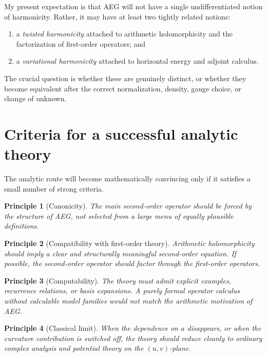 \documentclass[11pt]{article}
\newtheorem{principle}{Principle}[section]
\newcommand{\AEG}{AEG}
\begin{document}
My present expectation is that \AEG{} will not have a single undifferentiated notion of harmonicity. Rather, it may have at least two tightly related notions:
\begin{enumerate}[label=(\roman*)]
\item a \emph{twisted harmonicity} attached to arithmetic holomorphicity and the factorization of first-order operators; and
\item a \emph{variational harmonicity} attached to horizontal energy and adjoint calculus.
\end{enumerate}
The crucial question is whether these are genuinely distinct, or whether they become equivalent after the correct normalization, density, gauge choice, or change of unknown.

\section{Criteria for a successful analytic theory}

The analytic route will become mathematically convincing only if it satisfies a small number of strong criteria.

\begin{principle}[Canonicity]
The main second-order operator should be forced by the structure of \AEG{}, not selected from a large menu of equally plausible definitions.
\end{principle}

\begin{principle}[Compatibility with first-order theory]
Arithmetic holomorphicity should imply a clear and structurally meaningful second-order equation. If possible, the second-order operator should factor through the first-order operators.
\end{principle}

\begin{principle}[Computability]
The theory must admit explicit examples, recurrence relations, or basis expansions. A purely formal operator calculus without calculable model families would not match the arithmetic motivation of \AEG.
\end{principle}

\begin{principle}[Classical limit]
When the dependence on $a$ disappears, or when the curvature contribution is switched off, the theory should reduce cleanly to ordinary complex analysis and potential theory on the $(u,v)$-plane.
\end{principle}
\end{document}
